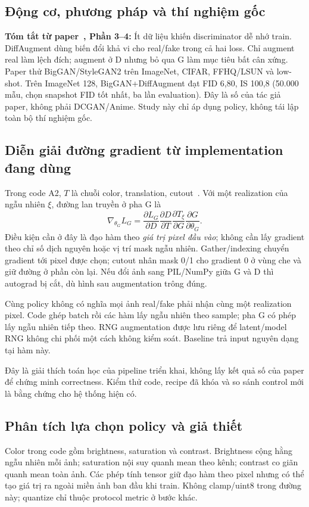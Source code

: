 \documentclass[11pt,a4paper]{article}
\begin{document}
\subsection{Động cơ, phương pháp và thí nghiệm gốc}
\noindent\textbf{Tóm tắt từ paper~\cite{diffaugment}, Phần 3--4:}
Ít dữ liệu khiến discriminator dễ nhớ train. DiffAugment dùng biến đổi khả vi cho real/fake trong cả hai loss. Chỉ augment real làm lệch đích; augment ở D nhưng bỏ qua G làm mục tiêu bất cân xứng. Paper thử BigGAN/StyleGAN2 trên ImageNet, CIFAR, FFHQ/LSUN và low-shot. Trên ImageNet 128, BigGAN+DiffAugment đạt FID 6,80, IS 100,8 (50.000 mẫu, chọn snapshot FID tốt nhất, ba lần evaluation). Đây là số của tác giả paper, không phải DCGAN/Anime. Study này chỉ áp dụng policy, không tái lập toàn bộ thí nghiệm gốc.

\subsection{Diễn giải đường gradient từ implementation đang dùng}
Trong code A2, $T$ là chuỗi color, translation, cutout~\cite{diffcode}. Với một realization của ngẫu nhiên $\xi$, đường lan truyền ở pha G là
\begin{equation}
\nabla_{\theta_G}L_G=
\frac{\partial L_G}{\partial D}\frac{\partial D}{\partial T}
\frac{\partial T_\xi}{\partial G}\frac{\partial G}{\partial\theta_G}.
\end{equation}
Điều kiện cần ở đây là đạo hàm theo \emph{giá trị pixel đầu vào}; không cần lấy gradient theo chỉ số dịch nguyên hoặc vị trí mask ngẫu nhiên. Gather/indexing chuyển gradient tới pixel được chọn; cutout nhân mask 0/1 cho gradient 0 ở vùng che và giữ đường ở phần còn lại. Nếu đổi ảnh sang PIL/NumPy giữa G và D thì autograd bị cắt, dù hình sau augmentation trông đúng.

Cùng policy không có nghĩa mọi ảnh real/fake phải nhận cùng một realization pixel. Code ghép batch rồi các hàm lấy ngẫu nhiên theo sample; pha G có phép lấy ngẫu nhiên tiếp theo. RNG augmentation được lưu riêng để latent/model RNG không chi phối một cách không kiểm soát. Baseline trả input nguyên dạng tại hàm này.

Đây là giải thích toán học của pipeline triển khai, không lấy kết quả số của paper để chứng minh correctness. Kiểm thử code, recipe đã khóa và so sánh control mới là bằng chứng cho hệ thống hiện có.
\clearpage

\subsection{Phân tích lựa chọn policy và giả thiết}
Color trong code gồm brightness, saturation và contrast. Brightness cộng hằng ngẫu nhiên mỗi ảnh; saturation nội suy quanh mean theo kênh; contrast co giãn quanh mean toàn ảnh. Các phép tính tensor giữ đạo hàm theo pixel nhưng có thể tạo giá trị ra ngoài miền ảnh ban đầu khi train. Không clamp/uint8 trong đường này; quantize chỉ thuộc protocol metric ở bước khác.
\end{document}
